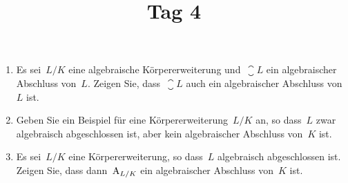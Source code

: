 \documentclass{scrartcl}
\title{\vspace{-1em}Tag 4}
\author{}
\date{}
\begin{document}
\maketitle
\vspace{-7em}

\begin{exercise}
  \begin{enumerate}
    \item
      Es sei~$L/K$ eine algebraische Körpererweiterung und~$\closure{L}$ ein algebraischer Abschluss von~$L$.
      Zeigen Sie, dass~$\closure{L}$ auch ein algebraischer Abschluss von~$L$ ist.
    \item
      Geben Sie ein Beispiel für eine Körpererweiterung~$L/K$ an, so dass~$L$ zwar algebraisch abgeschlossen ist, aber kein algebraischer Abschluss von~$K$ ist.
    \item
      Es sei~$L/K$ eine Körpererweiterung, so dass~$L$ algebraisch abgeschlossen ist.
      Zeigen Sie, dass dann~$\operatorname{A}_{L/K}$ ein algebraischer Abschluss von~$K$ ist.
  \end{enumerate}
\end{exercise}

%
\end{document}
